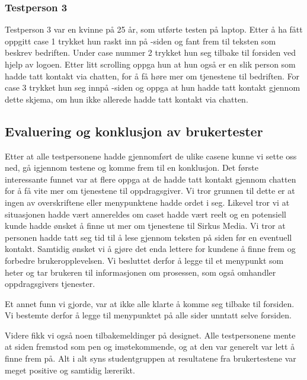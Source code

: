 \subsubsection{Testperson 3}
Testperson 3 var en kvinne på 25 år, som utførte testen på laptop. Etter å ha fått oppgitt case 1 trykket hun raskt inn på -siden og fant frem til teksten som beskrev bedriften. Under case nummer 2 trykket hun seg tilbake til forsiden ved hjelp av logoen. Etter litt scrolling oppga hun at hun også er en slik person som hadde tatt kontakt via chatten, for å få høre mer om tjenestene til bedriften. For case 3 trykket hun seg innpå -siden og oppga at hun hadde tatt kontakt gjennom dette skjema, om hun ikke allerede hadde tatt kontakt via chatten. 

\subsection{Evaluering og konklusjon av brukertester}
Etter at alle testpersonene hadde gjennomført de ulike casene kunne vi sette oss ned, gå igjennom testene og komme frem til en konklusjon. Det første interessante funnet var at flere oppga at de hadde tatt kontakt gjennom chatten for å få vite mer om tjenestene til oppdragsgiver. Vi tror grunnen til dette er at ingen av overskriftene eller menypunktene hadde ordet  i seg. Likevel tror vi at situasjonen hadde vært annereldes om caset hadde vært reelt og en potensiell kunde hadde ønsket å finne ut mer om tjenestene til Sirkus Media. Vi tror at personen hadde tatt seg tid til å lese gjennom teksten på siden før en eventuell kontakt. Samtidig ønsket vi å gjøre det enda lettere for kundene å finne frem og forbedre brukeropplevelsen. Vi besluttet derfor å legge til et menypunkt som heter  og tar brukeren til informasjonen om prosessen, som også omhandler oppdragsgivers tjenester.

Et annet funn vi gjorde, var at ikke alle klarte å komme seg tilbake til forsiden. Vi bestemte derfor å legge til menypunktet  på alle sider unntatt selve forsiden.

Videre fikk vi også noen tilbakemeldinger på designet. Alle testpersonene mente at siden fremstod som pen og imøtekommende, og at den var generelt var lett å finne frem på. Alt i alt syns studentgruppen at resultatene fra brukertestene var meget positive og samtidig lærerikt.

